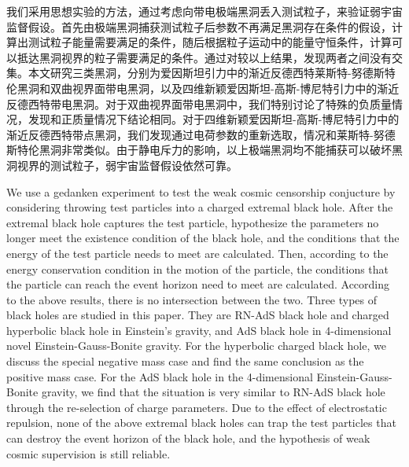 \begin{cabstract}
    我们采用思想实验的方法，通过考虑向带电极端黑洞丢入测试粒子，来验证弱宇宙监督假设。首先由极端黑洞捕获测试粒子后参数不再满足黑洞存在条件的假设，计算出测试粒子能量需要满足的条件，随后根据粒子运动中的能量守恒条件，计算可以抵达黑洞视界的粒子需要满足的条件。通过对较以上结果，发现两者之间没有交集。本文研究三类黑洞，分别为爱因斯坦引力中的渐近反德西特莱斯特-努德斯特伦黑洞和双曲视界面带电黑洞，以及四维新颖爱因斯坦-高斯-博尼特引力中的渐近反德西特带电黑洞。对于双曲视界面带电黑洞中，我们特别讨论了特殊的负质量情况，发现和正质量情况下结论相同。对于四维新颖爱因斯坦-高斯-博尼特引力中的渐近反德西特带点黑洞，我们发现通过电荷参数的重新选取，情况和莱斯特-努德斯特伦黑洞非常类似。由于静电斥力的影响，以上极端黑洞均不能捕获可以破坏黑洞视界的测试粒子，弱宇宙监督假设依然可靠。
\end{cabstract}

\begin{eabstract}
    We use a gedanken experiment to test the weak cosmic censorship conjucture by considering throwing test particles into a charged extremal black hole. After the extremal black hole captures the test particle, hypothesize the parameters no longer meet the existence condition of the black hole, and the conditions that the energy of the test particle needs to meet are calculated. Then, according to the energy conservation condition in the motion of the particle, the conditions that the particle can reach the event horizon need to meet are calculated. According to the above results, there is no intersection between the two. Three types of black holes are studied in this paper. They are RN-AdS black hole and charged hyperbolic black hole in Einstein's gravity, and AdS black hole in 4-dimensional novel Einstein-Gauss-Bonite gravity. For the hyperbolic charged black hole, we discuss the special negative mass case and find the same conclusion as the positive mass case. For the AdS black hole in the 4-dimensional Einstein-Gauss-Bonite gravity, we find that the situation is very similar to RN-AdS black hole through the re-selection of charge parameters. Due to the effect of electrostatic repulsion, none of the above extremal black holes can trap the test particles that can destroy the event horizon of the black hole, and the hypothesis of weak cosmic supervision is still reliable.

\end{eabstract}

\makecover
\tableofcontents
